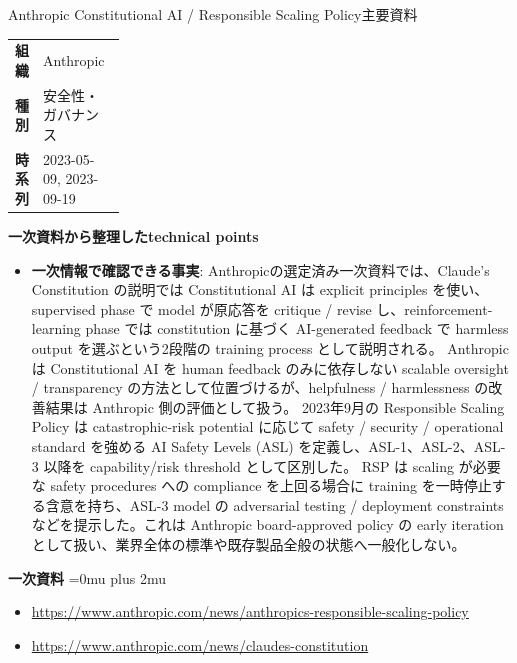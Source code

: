 \begin{technicalnote}{Anthropic Constitutional AI / Responsible Scaling Policy}{主要資料}
\begingroup
\begin{tabularx}{\linewidth}{@{}>{\bfseries}p{0.22\linewidth}X@{}}
組織 & Anthropic \\
種別 & 安全性・ガバナンス \\
時系列 & 2023-05-09, 2023-09-19 \\
\end{tabularx}
\smallskip
{\bfseries 一次資料から整理したtechnical points}
\begin{itemize}[leftmargin=1.5em,itemsep=0.35em]
\item \textbf{一次情報で確認できる事実}: Anthropicの選定済み一次資料では、Claude's Constitution の説明では Constitutional AI は explicit principles を使い、supervised phase で model が原応答を critique / revise し、reinforcement-learning phase では constitution に基づく AI-generated feedback で harmless output を選ぶという2段階の training process として説明される。 Anthropic は Constitutional AI を human feedback のみに依存しない scalable oversight / transparency の方法として位置づけるが、helpfulness / harmlessness の改善結果は Anthropic 側の評価として扱う。 2023年9月の Responsible Scaling Policy は catastrophic-risk potential に応じて safety / security / operational standard を強める AI Safety Levels (ASL) を定義し、ASL-1、ASL-2、ASL-3 以降を capability/risk threshold として区別した。 RSP は scaling が必要な safety procedures への compliance を上回る場合に training を一時停止する含意を持ち、ASL-3 model の adversarial testing / deployment constraints などを提示した。これは Anthropic board-approved policy の early iteration として扱い、業界全体の標準や既存製品全般の状態へ一般化しない。
\end{itemize}
\begin{minipage}{\linewidth}
\begin{samepage}
{\bfseries 一次資料}
\begingroup\sloppy
\Urlmuskip=0mu plus 2mu\relax
\begin{itemize}[leftmargin=1.5em,itemsep=0.25em]
\item {\scriptsize\url{https://www.anthropic.com/news/anthropics-responsible-scaling-policy}}
\item {\scriptsize\url{https://www.anthropic.com/news/claudes-constitution}}
\end{itemize}
\endgroup
\end{samepage}
\end{minipage}
\endgroup
\end{technicalnote}
\medskip
